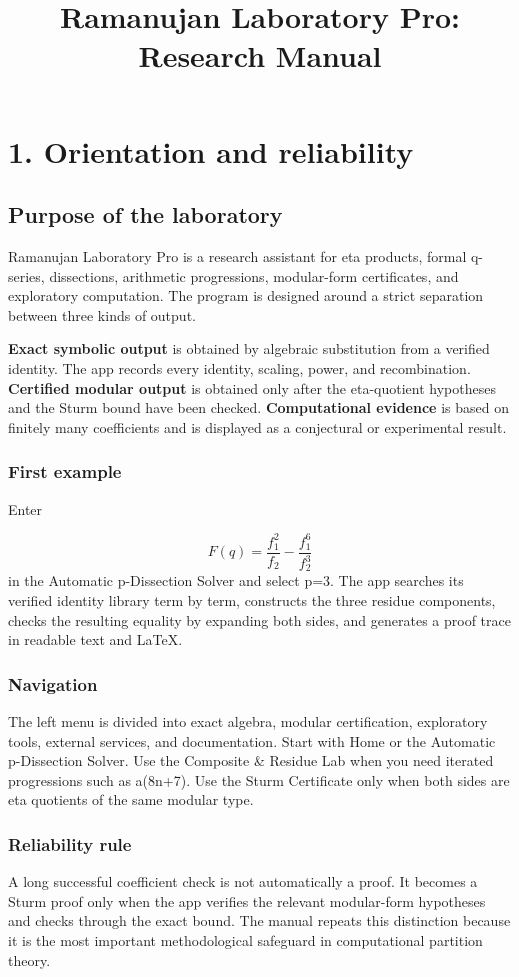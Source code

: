 \documentclass[11pt]{article}
\title{Ramanujan Laboratory Pro: Research Manual}
\date{}
\begin{document}
\maketitle
\tableofcontents
\newpage
\section{1. Orientation and reliability}
\subsection*{Purpose of the laboratory}
Ramanujan Laboratory Pro is a research assistant for eta products, formal q-series, dissections, arithmetic progressions, modular-form certificates, and exploratory computation. The program is designed around a strict separation between three kinds of output.

\textbf{Exact symbolic output} is obtained by algebraic substitution from a verified identity. The app records every identity, scaling, power, and recombination. \textbf{Certified modular output} is obtained only after the eta-quotient hypotheses and the Sturm bound have been checked. \textbf{Computational evidence} is based on finitely many coefficients and is displayed as a conjectural or experimental result.

\subsubsection*{First example}
Enter

\[
F(q)=\frac{f_1^2}{f_2}-\frac{f_1^6}{f_2^3}
\]
in the Automatic p-Dissection Solver and select p=3. The app searches its verified identity library term by term, constructs the three residue components, checks the resulting equality by expanding both sides, and generates a proof trace in readable text and LaTeX.

\subsubsection*{Navigation}
The left menu is divided into exact algebra, modular certification, exploratory tools, external services, and documentation. Start with Home or the Automatic p-Dissection Solver. Use the Composite \& Residue Lab when you need iterated progressions such as a(8n+7). Use the Sturm Certificate only when both sides are eta quotients of the same modular type.

\subsubsection*{Reliability rule}
A long successful coefficient check is not automatically a proof. It becomes a Sturm proof only when the app verifies the relevant modular-form hypotheses and checks through the exact bound. The manual repeats this distinction because it is the most important methodological safeguard in computational partition theory.
\end{document}
